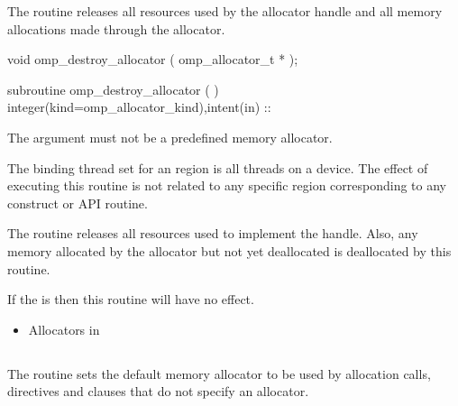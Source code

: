 \summary
The  routine releases all resources used by the allocator handle and all memory allocations made through the allocator.

\format
\begin{ccppspecific}
\begin{ompcFunction}
void omp_destroy_allocator ( omp_allocator_t * );
\end{ompcFunction}
\end{ccppspecific}
\begin{fortranspecific}
\begin{ompfSubroutine}
subroutine omp_destroy_allocator (  )
integer(kind=omp_allocator_kind),intent(in) :: 
\end{ompfSubroutine}
\end{fortranspecific}

\constraints

The  argument must not be a predefined memory allocator.

\binding

The binding thread set for an  region is all threads on a device.
The effect of executing this routine is not related to any specific region corresponding to any construct or API routine.

\effect

The  routine releases all resources used to implement the  handle. Also, any memory allocated by the allocator but not yet deallocated  is deallocated by this routine. 

If the  is  then this routine will have no effect.
 
\crossreferences
\begin{itemize}
\item Allocators in 
\end{itemize}


\subsection{}
\label{subsec:omp_set_default_allocator}

\summary
The  routine sets the default memory allocator to be used by allocation calls,  directives and  clauses that do not specify an allocator.

